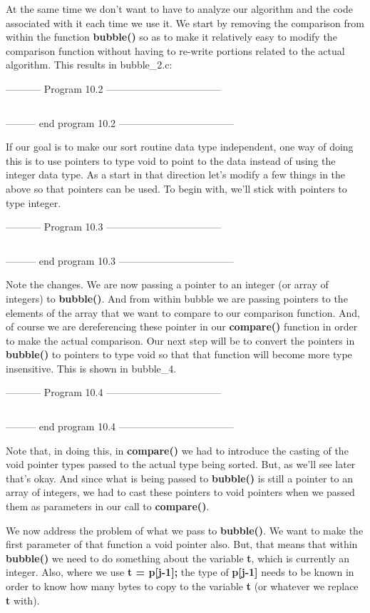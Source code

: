 At the same time we don't want to have to analyze our algorithm and the
code associated with it each time we use it. We start by removing the
comparison from within the function \textbf{bubble()} so as to make it
relatively easy to modify the comparison function without having to
re-write portions related to the actual algorithm. This results in
bubble\_2.c:

-----------  Program 10.2  -----------------------------------
\inputminted{c}{../src/ch10-2.c}
--------- end program 10.2 -----------------------------------

If our goal is to make our sort routine data type independent, one way
of doing this is to use pointers to type void to point to the data
instead of using the integer data type. As a start in that direction
let's modify a few things in the above so that pointers can be used. To
begin with, we'll stick with pointers to type integer.

-----------  Program 10.3  -----------------------------------
\inputminted{c}{../src/ch10-3.c}
--------- end program 10.3 -----------------------------------

Note the changes. We are now passing a pointer to an integer (or array
of integers) to \textbf{bubble()}. And from within bubble we are passing
pointers to the elements of the array that we want to compare to our
comparison function. And, of course we are dereferencing these pointer
in our \textbf{compare()} function in order to make the actual
comparison. Our next step will be to convert the pointers in
\textbf{bubble()} to pointers to type void so that that function will
become more type insensitive. This is shown in bubble\_4.

-----------  Program 10.4  -----------------------------------
\inputminted{c}{../src/ch10-4.c}
--------- end program 10.4 -----------------------------------

Note that, in doing this, in \textbf{compare()} we had to introduce the
casting of the void pointer types passed to the actual type being
sorted. But, as we'll see later that's okay. And since what is being
passed to \textbf{bubble()} is still a pointer to an array of integers,
we had to cast these pointers to void pointers when we passed them as
parameters in our call to \textbf{compare()}.

We now address the problem of what we pass to \textbf{bubble()}. We want
to make the first parameter of that function a void pointer also. But,
that means that within \textbf{bubble()} we need to do something about
the variable \textbf{t}, which is currently an integer. Also, where we
use \textbf{t = p{[}j-1{]};} the type of \textbf{p{[}j-1{]}} needs to be
known in order to know how many bytes to copy to the variable \textbf{t}
(or whatever we replace \textbf{t} with).

